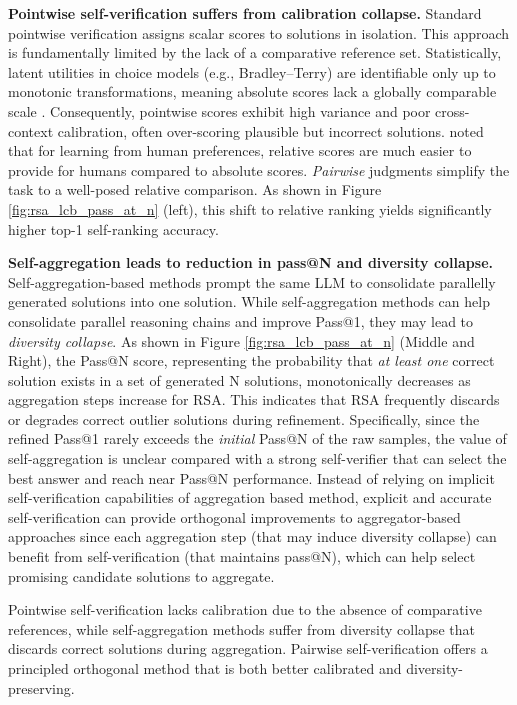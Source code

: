 \textbf{Pointwise self-verification suffers from calibration collapse.}
Standard pointwise verification assigns scalar scores to solutions in isolation. This approach is fundamentally limited by the lack of a comparative reference set. Statistically, latent utilities in choice models (e.g., Bradley--Terry) are identifiable only up to monotonic transformations, meaning absolute scores lack a globally comparable scale \citep{bradley1952rank}. Consequently, pointwise scores exhibit high variance and poor cross-context calibration, often over-scoring plausible but incorrect solutions. \citet{christiano2017rlhf} noted that for learning from human preferences, relative scores are much easier to provide for humans compared to absolute scores. \textit{Pairwise} judgments simplify the task to a well-posed relative comparison. As shown in Figure \ref{fig:rsa_lcb_pass_at_n} (left), this shift to relative ranking yields significantly higher top-1 self-ranking accuracy.

\textbf{Self-aggregation leads to reduction in pass@N and diversity collapse.}
Self-aggregation-based methods prompt the same LLM to consolidate parallelly generated solutions into one solution. While self-aggregation methods \citep{venkatraman2025recursiveselfaggregationunlocksdeep, khairi2025makingtakingbestn, li2025llms, madaan2025rethinkingthinkingtokensllms} can help consolidate parallel reasoning chains and improve Pass@1, they may lead to \textit{diversity collapse}. As shown in Figure \ref{fig:rsa_lcb_pass_at_n} (Middle and Right), the Pass@N score, representing the probability that \textit{at least one} correct solution exists in a set of generated N solutions, monotonically decreases as aggregation steps increase for RSA. This indicates that RSA frequently discards or degrades correct outlier solutions during refinement. Specifically, since the refined Pass@1 rarely exceeds the \textit{initial} Pass@N of the raw samples, the value of self-aggregation is unclear compared with a strong self-verifier that can select the best answer and reach near Pass@N performance. Instead of relying on implicit self-verification capabilities of aggregation based method, explicit and accurate self-verification can provide orthogonal improvements to aggregator-based approaches since each aggregation step (that may induce diversity collapse) can benefit from self-verification (that maintains pass@N), which can help select promising candidate solutions to aggregate.


\begin{tcolorbox}[title=Takeaway: Key Limitations of Existing Self-Verification and Aggregation Approaches, colback=green!5]
Pointwise self-verification lacks calibration due to the absence of comparative references, while self-aggregation methods suffer from diversity collapse that discards correct solutions during aggregation. Pairwise self-verification offers a principled orthogonal method that is both better calibrated and diversity-preserving.
\end{tcolorbox}

